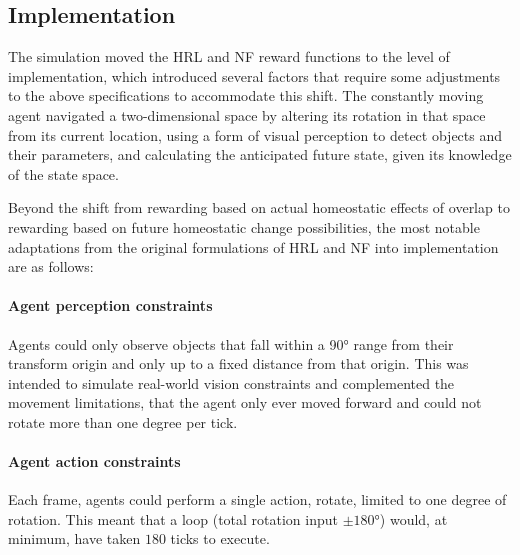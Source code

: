 


\subsection{Implementation}\label{model-implementation}

The simulation moved the HRL and NF reward functions to the level of implementation, which introduced several factors that require some adjustments to the above specifications to accommodate this shift. The constantly moving agent navigated a two-dimensional space by altering its rotation in that space from its current location, using a form of visual perception to detect objects and their parameters, and calculating the anticipated future state, given its knowledge of the state space.

Beyond the shift from rewarding based on actual homeostatic effects of overlap to rewarding based on future homeostatic change possibilities, the most notable adaptations from the original formulations of HRL and NF into implementation are as follows:

\paragraph{Agent perception constraints}

Agents could only observe objects that fall within a 90° range from their transform origin and only up to a fixed distance from that origin. This was intended to simulate real-world vision constraints and complemented the movement limitations, that the agent only ever moved forward and could not rotate more than one degree per tick.

\paragraph{Agent action constraints}

Each frame, agents could perform a single action, rotate, limited to one degree of rotation. This meant that a loop (total rotation input \(±180°\)) would, at minimum, have taken \(180\) ticks to execute. 

